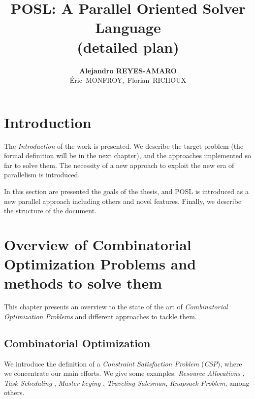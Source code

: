 \documentclass[a4paper]{book} %
\newcommand{\posl}{{\sc POSL}}
\newcommand{\COP}{\textit{Combinatorial Optimization Problem}}
\newcommand{\COPs}{\COP\textit{s}}
\newcommand{\CSP}{\textit{Constraint Satisfaction Problem}}
\newcommand{\csp}{\textit{CSP}}
\begin{document}
\title{\posl: A Parallel Oriented Solver Language \\ {\small (detailed plan)}}
\author{\textbf{Alejandro REYES-AMARO}\\ \mbox{\'Eric MONFROY, Florian RICHOUX}}

\maketitle

\tableofcontents

\chapter{Introduction}

The \textit{Introduction} of the work is presented. We describe the target problem (the formal definition will be in the next chapter), and the approaches implemented so far to solve them. The necessity of a new approach to exploit the new era of parallelism is introduced. 

In this section are presented the goals of the thesis, and \posl{} is introduced as a new parallel approach including others and novel features. Finally, we describe the structure of the document. 

\chapter{Overview of Combinatorial Optimization Problems and methods to solve them}

This chapter presents an overview to the state of the art of \COPs{} and different approaches to tackle them. 

\section{Combinatorial Optimization}

We introduce the definition of a \CSP{} (\csp), where we concentrate our main efforts. We give some examples: {\it Resource Allocations} \cite{Akplogan2011}, \textit{Task Scheduling} \cite{Sibbesen2008}, \textit{Master-keying} \cite{Espelage2000}, \textit{Traveling Salesman}, \textit{Knapsack Problem}, among others.
\end{document}
